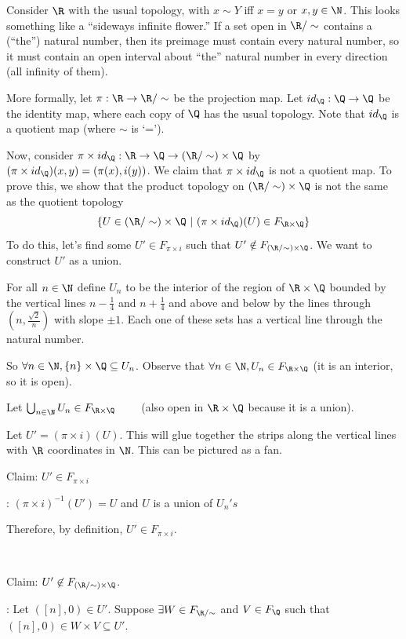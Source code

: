 Consider $\R$ with the usual topology, with $x\sim Y$ iff $x=y$ or $x,y\in \N$.  This looks something like a ``sideways infinite flower.''
\placeholder
If a set open in $\R/\sim$ contains a (``the'') natural number, then its preimage must contain every natural number, so it must contain an open interval about ``the'' natural number in every direction (all infinity of them).    

More formally, let $\pi:\R\to\R/\sim$ be the projection map.  Let $id_\Q:\Q\to\Q$ be the identity map, where each copy of $\Q$ has the usual topology.  Note that $id_\Q$ is a quotient map (where $\sim$ is `=').  

Now, consider $\pi\times id_\Q:\R\to\Q\to(\R/\sim)\times\Q$ by $(\pi\times id_\Q)(x,y) = (\pi(x), i(y))$.  We claim that $\pi\times id_\Q$ is not a quotient map.  To prove this, we show that the product topology on $(\R/\sim)\times\Q$ is not the same as the quotient topology
\[ \{ U\in (\R/\sim)\times\Q\ |\ (\pi\times id_\Q)(U)\in F_{\R\times\Q} \} \]
To do this, let's find some $U' \in F_{\pi \times i}$ such that $U' \notin F_{(\R/\sim) \times \Q}$.  We want to construct $U'$ as a union.

For all $n\in \N$ define $U_n$ to be the interior of the region of $\R\times\Q$ bounded by the vertical lines $n-\frac{1}{4}$ and $n+\frac{1}{4}$ and above and below by the lines through $(n, \frac{\sqrt{2}}{n})$ with slope $\pm 1$. Each one of these sets has a vertical line through the natural number.

So $\forall n \in \N, \{n\}\times \Q \subseteq U_n$. Observe that $\forall n\in \N, U_n \in F_{\R\times\Q}$ (it is an interior, so it is open).

Let $\bigcup_{n \in\N} U_n \in F_{\R\times\Q} \qquad$ (also open in $\R\times\Q$ because it is a union).

Let $U' = (\pi \times i)(U).$ This will glue together the strips along the vertical lines with $\R$ coordinates in $\N$. This can be pictured as a fan.
\placeholder

Claim: $U' \in F_{\pi \times i}$

\proof: $(\pi \times i)^{-1}(U') = U$ and $U$ is a union of $U_n 's$

Therefore, by definition, $U'\in F_{\pi\times i}$.

\mbox{ }

Claim: $U'\not\in F_{(\R/\sim) \times \Q}$.

\proof: Let $([n],0) \in U'$. Suppose $\exists W \in F_{\R/\sim}$ and $V \in F_{\Q}$ such that $([n], 0)\in W \times V \subseteq U'$.

